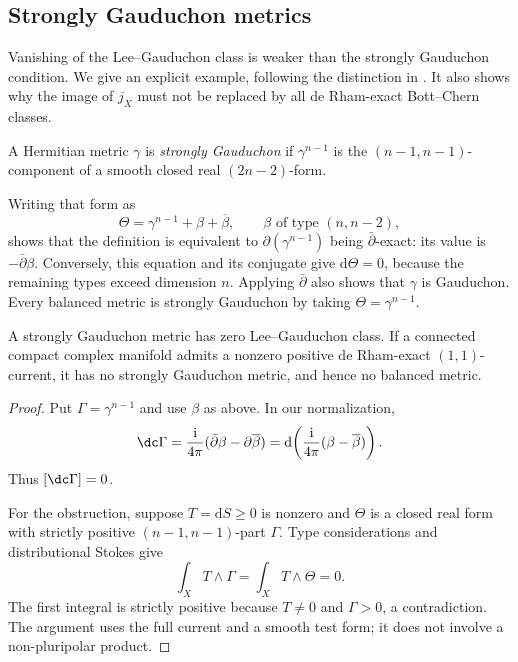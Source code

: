 \subsection{Strongly Gauduchon metrics}
\label{sec:lee-gauduchon-strong}

Vanishing of the Lee--Gauduchon class is weaker than the strongly Gauduchon condition. We give an explicit example, following the distinction in \cite[Remarks 5.6--5.8]{OV25LeeGauduchon}. It also shows why the image of $j_X$ must not be replaced by all de Rham-exact Bott--Chern classes.

\begin{definition}
A Hermitian metric $\gamma$ is \emph{strongly Gauduchon} if $\gamma^{n-1}$ is the $(n-1,n-1)$-component of a smooth closed real $(2n-2)$-form.
\end{definition}

Writing that form as
\[
 \Theta=\gamma^{n-1}+\beta+\overline\beta,
 \qquad \beta\text{ of type }(n,n-2),
\]
shows that the definition is equivalent to $\partial(\gamma^{n-1})$ being $\bar\partial$-exact: its value is $-\bar\partial\beta$. Conversely, this equation and its conjugate give $\mathrm{d}\Theta=0$, because the remaining types exceed dimension $n$. Applying $\bar\partial$ also shows that $\gamma$ is Gauduchon. Every balanced metric is strongly Gauduchon by taking $\Theta=\gamma^{n-1}$.

\begin{proposition}\label{prop:lee-strong-obstruction}
A strongly Gauduchon metric has zero Lee--Gauduchon class. If a connected compact complex manifold admits a nonzero positive de Rham-exact $(1,1)$-current, it has no strongly Gauduchon metric, and hence no balanced metric.
\end{proposition}
\begin{proof}
Put $\Gamma=\gamma^{n-1}$ and use $\beta$ as above. In our normalization,
\[
 \dc\Gamma
 =\frac{\mathrm i}{4\pi}
       (\bar\partial\beta-\partial\overline\beta)
 =\mathrm{d}\!\left(\frac{\mathrm i}{4\pi}
                              (\beta-\overline\beta)\right).
\]
Thus $[\dc\Gamma]=0$.

For the obstruction, suppose $T=\mathrm{d}S\geq0$ is nonzero and $\Theta$ is a closed real form with strictly positive $(n-1,n-1)$-part $\Gamma$. Type considerations and distributional Stokes give
\[
 \int_XT\wedge\Gamma
 =\int_XT\wedge\Theta=0.
\]
The first integral is strictly positive because $T\ne0$ and $\Gamma>0$, a contradiction. The argument uses the full current and a smooth test form; it does not involve a non-pluripolar product.
\end{proof}

